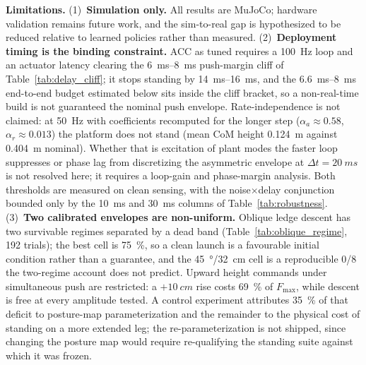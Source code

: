 \documentclass[conference]{IEEEtran}
\begin{document}
\textbf{Limitations.}
(1)~\textbf{Simulation only.} All results are MuJoCo; hardware validation remains future work, and the sim-to-real gap is hypothesized to be reduced relative to learned policies rather than measured.
(2)~\textbf{Deployment timing is the binding constraint.} ACC as tuned requires a \SI{100}{Hz} loop and an actuator latency clearing the \SIrange{6}{8}{ms} push-margin cliff of Table~\ref{tab:delay_cliff}; it stops standing by \SIrange{14}{16}{ms}, and the \SIrange{6.6}{8}{ms} end-to-end budget estimated below sits inside the cliff bracket, so a non-real-time build is not guaranteed the nominal push envelope. Rate-independence is not claimed: at \SI{50}{Hz} with coefficients recomputed for the longer step ($\alpha_a{\approx}0.58$, $\alpha_r{\approx}0.013$) the platform does not stand (mean CoM height \SI{0.124}{m} against \SI{0.404}{m} nominal). Whether that is excitation of plant modes the faster loop suppresses or phase lag from discretizing the asymmetric envelope at $\Delta t{=}\SI{20}{ms}$ is not resolved here; it requires a loop-gain and phase-margin analysis. Both thresholds are measured on clean sensing, with the noise$\times$delay conjunction bounded only by the \SI{10}{ms} and \SI{30}{ms} columns of Table~\ref{tab:robustness}.
(3)~\textbf{Two calibrated envelopes are non-uniform.} Oblique ledge descent has two survivable regimes separated by a dead band (Table~\ref{tab:oblique_regime}, \num{192} trials); the best cell is \SI{75}{\percent}, so a clean launch is a favourable initial condition rather than a guarantee, and the \SI{45}{\degree}/\SI{32}{cm} cell is a reproducible \num{0}/\num{8} the two-regime account does not predict. Upward height commands under simultaneous push are restricted: a ${+}\SI{10}{cm}$ rise costs \SI{69}{\percent} of $F_{\max}$, while descent is free at every amplitude tested. A control experiment attributes \SI{35}{\percent} of that deficit to posture-map parameterization and the remainder to the physical cost of standing on a more extended leg; the re-parameterization is not shipped, since changing the posture map would require re-qualifying the standing suite against which it was frozen.
\end{document}
